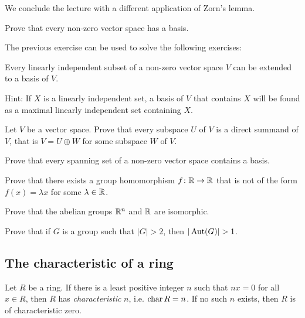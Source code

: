 We conclude the lecture with a different application of Zorn's lemma.  

\begin{bonus}
	Prove that every non-zero vector space has a basis.
\end{bonus}

The previous exercise can be used to solve the following exercises:

\begin{bonus}
\label{xca:extend}
    Every linearly independent subset of a non-zero vector space
    $V$ can be extended to a basis of $V$.
\end{bonus} 

Hint: If $X$ is a linearly independent set, a basis 
of $V$ that contains $X$ will be found as a maximal linearly independent set 
containing $X$. 

\begin{bonus}
    Let $V$ be a vector space. Prove that every subspace $U$ of $V$ is a direct summand of $V$, that is
    $V=U\oplus W$ for some subspace $W$ of $V$. 
\end{bonus}

\begin{bonus}
    Prove that every spanning set of a non-zero vector space
    contains a basis. 
\end{bonus}

\begin{bonus}
\label{xca:fx=cx}
    Prove that there exists a group homomorphism $f\colon\mathbb{R}\to\mathbb{R}$ that 
    is not of the form $f(x)=\lambda x$ for some $\lambda\in\mathbb{R}$. 
\end{bonus}


\begin{bonus}
\label{xca:Rn=R}
    Prove that the abelian groups $\mathbb{R}^n$ and $\mathbb{R}$ are isomorphic.
\end{bonus}

\begin{bonus}
\label{xca:aut}
    Prove that if $G$ is a group such that $|G|>2$, then $|\Aut(G)|>1$.
\end{bonus}

\subsection{The characteristic of a ring}

\begin{definition}
Let $R$ be a ring. If there is a least positive integer $n$ such that 
$nx=0$ for all $x\in R$, then $R$ has \emph{characteristic} $n$, i.e. $\operatorname{char} R=n$. If no such $n$ exists, 
then $R$ is of characteristic zero. 
\end{definition}

